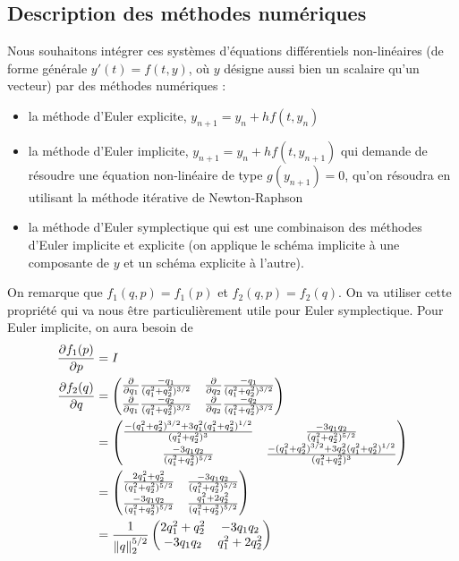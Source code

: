 \subsection{Description des méthodes numériques}
Nous souhaitons intégrer ces systèmes d'équations différentiels non-linéaires (de forme générale $y'(t) = f(t,y)$, où $y$ désigne aussi bien un scalaire qu'un vecteur) par des méthodes numériques : 
\begin{itemize}
\item la méthode d'Euler explicite, $y_{n+1} = y_n + h f(t,y_n)$
\item la méthode d'Euler implicite, $y_{n+1} = y_n + h f(t,y_{n+1})$ qui demande de résoudre une équation non-linéaire de type $g(y_{n+1})=0$, qu'on résoudra en utilisant la méthode itérative de Newton-Raphson
\item la méthode d'Euler symplectique qui est une combinaison des méthodes d'Euler implicite et explicite (on applique le schéma implicite à une composante de $y$ et un schéma explicite à l'autre). 
\end{itemize}

On remarque que $f_1(q,p) = f_1(p)$ et $f_2(q,p) = f_2(q)$.
On va utiliser cette propriété qui va nous être particulièrement utile pour Euler symplectique.
Pour Euler implicite, on aura besoin de
\begin{align*}
  \frac{\partial f_1(p)}{\partial p} & = I\\
  \frac{\partial f_2(q)}{\partial q} & =
  \begin{pmatrix}
    \frac{\partial }{\partial q_1}\frac{-q_1}{(q_1^2 + q_2^2)^{3/2}} &
    \frac{\partial }{\partial q_2}\frac{-q_1}{(q_1^2 + q_2^2)^{3/2}}\\
    \frac{\partial }{\partial q_1}\frac{-q_2}{(q_1^2 + q_2^2)^{3/2}} &
    \frac{\partial }{\partial q_2}\frac{-q_2}{(q_1^2 + q_2^2)^{3/2}}
  \end{pmatrix}\\
  & =
  \begin{pmatrix}
    \frac{-(q_1^2 + q_2^2)^{3/2} + 3q_1^2(q_1^2 + q_2^2)^{1/2}}{(q_1^2 + q_2^2)^3} &
    \frac{-3q_1q_2}{(q_1^2 + q_2^2)^{5/2}}\\
    \frac{-3q_1q_2}{(q_1^2 + q_2^2)^{5/2}} &
    \frac{-(q_1^2 + q_2^2)^{3/2} + 3q_2^2(q_1^2 + q_2^2)^{1/2}}{(q_1^2 + q_2^2)^3}
  \end{pmatrix}\\
  & =
  \begin{pmatrix}
    \frac{2q_1^2 + q_2^2}{(q_1^2 + q_2^2)^{5/2}} &
    \frac{-3q_1q_2}{(q_1^2 + q_2^2)^{5/2}}\\
    \frac{-3q_1q_2}{(q_1^2 + q_2^2)^{5/2}} &
    \frac{q_1^2 + 2q_2^2}{(q_1^2 + q_2^2)^{5/2}}
  \end{pmatrix}\\
  & =
  \frac{1}{\|q\|_2^{5/2}}
  \begin{pmatrix}
    2q_1^2 + q_2^2 &
    -3q_1q_2\\
    -3q_1q_2 &
    q_1^2 + 2q_2^2
  \end{pmatrix}
\end{align*}

